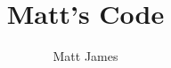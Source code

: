 \documentclass[a4paper,12pt]{book}
\begin{document}
\author{Matt James}
\title{Matt's Code}
\date{}

\frontmatter
\maketitle
\tableofcontents

\mainmatter



\backmatter
\end{document}
